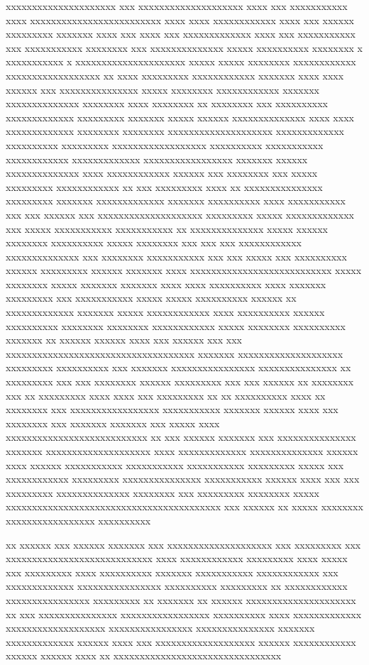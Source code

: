 \begin{introduction}
xxxxxxxxxxxxxxxxxxxxx xxx xxxxxxxxxxxxxxxxxxxx xxxx xxx xxxxxxxxxxx
xxxx xxxxxxxxxxxxxxxxxxxxxxxxx xxxx xxxx xxxxxxxxxxxx xxxx xxx xxxxxx xxxxxxxxx xxxxxxx xxxx xxx xxxx xxx xxxxxxxxxxxxx xxxx xxx xxxxxxxxxxx xxx xxxxxxxxxxx xxxxxxxx xxx xxxxxxxxxxxxxx xxxxx xxxxxxxxxx xxxxxxxx
x
xxxxxxxxxxx
x
xxxxxxxxxxxxxxxxxxxxx xxxxx xxxxx xxxxxxxx xxxxxxxxxxxx xxxxxxxxxxxxxxxxxx
xx xxxx xxxxxxxxx xxxxxxxxxxxx xxxxxxx xxxx xxxx xxxxxx xxx xxxxxxxxxxxxxxx xxxxx xxxxxxxx xxxxxxxxxxxx xxxxxxx xxxxxxxxxxxxxx xxxxxxxx xxxx xxxxxxxx xx xxxxxxxx xxx xxxxxxxxxx xxxxxxxxxxxxx xxxxxxxxx xxxxxxx xxxxx xxxxxx xxxxxxxxxxxxxx xxxx xxxx xxxxxxxxxxxxx xxxxxxxx xxxxxxxx xxxxxxxxxxxxxxxxxxxx xxxxxxxxxxxxx xxxxxxxxxx xxxxxxxxx xxxxxxxxxxxxxxxxxx xxxxxxxxxx xxxxxxxxxxx xxxxxxxxxxxx xxxxxxxxxxxxx xxxxxxxxxxxxxxxxx xxxxxxx xxxxxx xxxxxxxxxxxxxx xxxx xxxxxxxxxxxx xxxxxx xxx xxxxxxxx xxx xxxxx xxxxxxxxx xxxxxxxxxxxx xx xxx xxxxxxxxx xxxx xx xxxxxxxxxxxxxxx xxxxxxxxx xxxxxxx xxxxxxxxxxxxx xxxxxxx xxxxxxxxxx xxxx xxxxxxxxxxx xxx xxx xxxxxx xxx xxxxxxxxxxxxxxxxxxxx xxxxxxxxx xxxxx xxxxxxxxxxxxx xxx xxxxx xxxxxxxxxxx xxxxxxxxxxx xx xxxxxxxxxxxxxx xxxxx xxxxxx xxxxxxxx xxxxxxxxxx xxxxx xxxxxxxx xxx xxx xxx xxxxxxxxxxxx xxxxxxxxxxxxxx xxx xxxxxxxx xxxxxxxxxxx xxx xxx xxxxx xxx xxxxxxxxxx xxxxxx xxxxxxxxx xxxxxx xxxxxxx xxxx xxxxxxxxxxxxxxxxxxxxxxxxxxx xxxxx xxxxxxxx xxxxx xxxxxxx xxxxxxx xxxx xxxx xxxxxxxxxx xxxx xxxxxxx xxxxxxxxx xxx xxxxxxxxxxx xxxxx xxxxx xxxxxxxxxx xxxxxx xx xxxxxxxxxxxxx xxxxxxx xxxxx xxxxxxxxxxxx xxxx xxxxxxxxxx xxxxxx xxxxxxxxxx xxxxxxxx xxxxxxxx xxxxxxxxxxxx xxxxx xxxxxxxx xxxxxxxxxx xxxxxxx xx xxxxxx xxxxxx xxxx xxx xxxxxx xxx xxx xxxxxxxxxxxxxxxxxxxxxxxxxxxxxxxxxxxx xxxxxxx xxxxxxxxxxxxxxxxxxxx xxxxxxxxx xxxxxxxxxx xxx xxxxxxx xxxxxxxxxxxxxxxx xxxxxxxxxxxxxxx xx xxxxxxxxx xxx xxx xxxxxxxx xxxxxx xxxxxxxxx xxx xxx xxxxxx xx xxxxxxxx xxx xx xxxxxxxxx xxxx xxxx xxx xxxxxxxxx xx xx xxxxxxxxxx xxxx xx xxxxxxxx xxx xxxxxxxxxxxxxxxxx xxxxxxxxxxx xxxxxxx xxxxxx xxxx xxx xxxxxxxx xxx xxxxxxx xxxxxxx xxx xxxxx xxxx xxxxxxxxxxxxxxxxxxxxxxxxxxx xx xxx xxxxxx xxxxxxx xxx xxxxxxxxxxxxxxx xxxxxxx xxxxxxxxxxxxxxxxxxxx xxxx xxxxxxxxxxxxx xxxxxxxxxxxxxx xxxxxx xxxx xxxxxx xxxxxxxxxxx xxxxxxxxxxx xxxxxxxxxxx xxxxxxxxx xxxxx xxx xxxxxxxxxxxx xxxxxxxxx xxxxxxxxxxxxxxx xxxxxxxxxxx xxxxxx xxxx xxx xxx xxxxxxxxx xxxxxxxxxxxxxx xxxxxxxx xxx xxxxxxxxx xxxxxxxx xxxxx xxxxxxxxxxxxxxxxxxxxxxxxxxxxxxxxxxxxxxxxx xxx xxxxxx xx xxxxx xxxxxxxx xxxxxxxxxxxxxxxxx xxxxxxxxxx

xx xxxxxx xxx xxxxxx xxxxxxx xxx xxxxxxxxxxxxxxxxxxxx xxx xxxxxxxxx xxx xxxxxxxxxxxxxxxxxxxxxxxxxxxx xxxx xxxxxxxxxxxx xxxxxxxxx xxxx xxxxx xxx xxxxxxxxx xxxx xxxxxxxxxx xxxxxxx xxxxxxxxxxx xxxxxxxxxxxx xxx xxxxxxxxxxxxx xxxxxxxxxxxxxxxx xxxxxxxxxx xxxxxxxxx xx xxxxxxxxxxxx xxxxxxxxxxxxxxxx xxxxxxxxx xx xxxxxxx xx xxxxxx xxxxxxxxxxxxxxxxxxxxx xx xxx xxxxxxxxxxxxxxx xxxxxxxxxxxxxxxxx xxxxxxxxxx xxxx xxxxxxxxxxxxx xxxxxxxxxxxxxxxxxxx xxxxxxxxxxxxxxxx xxxxxxxxxxxxxxx xxxxxxx xxxxxxxxxxxxx xxxxxx xxxx xxx xxxxxxxxxxxxxxxxxxx xxxxxx xxxxxxxxxxxx xxxxxx xxxxxx xxxx xx xxxxxxxxxxxxxxxxxxxxxxxxxxxxxxxx

\end{introduction}
